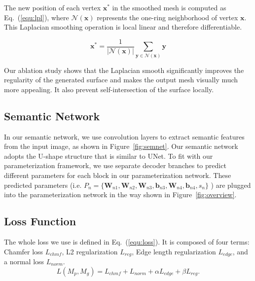 
The new position of each vertex $\mathbf{x}^{*}$ in the smoothed mesh is computed as Eq.~(\ref{equ:lpl}), where $\mathcal{N}(\mathbf{x})$ represents the one-ring neighborhood of vertex $\mathbf{x}$. 
This Laplacian smoothing operation is local linear and therefore differentiable.

\begin{equation}
\mathbf{x}^* = \frac{1}{|\mathcal{N}(\mathbf{x})|}\sum_{\mathbf{y}\in\mathcal{N}(\mathbf{x})}\mathbf{y}
\label{equ:lpl}
\end{equation}

Our ablation study shows that the Laplacian smooth significantly improves the regularity of the generated surface and makes the output mesh visually much more appealing. It also prevent self-intersection of the surface locally.


\subsection{Semantic Network}
\label{subsec:semnet}
%
In our semantic network, we use convolution layers to extract semantic features from the input image, as shown in Figure~\ref{fig:semnet}.  
Our semantic network adopts the U-shape structure that is similar to UNet\cite{unet}. 
To fit with our parameterization framework, we use separate decoder branches to predict different parameters for each block in our parameterization network. These predicted parameters (i.e. $P_n=\{\mathbf{W}_{n1},\mathbf{W}_{n2},\mathbf{W}_{n3},\mathbf{b}_{n3},\mathbf{W}_{n4},\mathbf{b}_{n4},s_{n}\}$ ) are plugged into the parameterization network in the way shown in Figure~\ref{fig:overview}.

\subsection{Loss Function}

The whole loss we use is defined in Eq.~(\ref{equ:loss}).
It is composed of four terms: Chamfer loss $L_{chmf}$, L2 regularization $L_{reg}$, Edge length regularization $L_{edge}$, and a normal loss $L_{norm}$.
\begin{equation}
\label{equ:loss}
L(M_p, M_g ) = L_{chmf} + L_{norm} +\alpha L_{edge}+ \beta L_{reg}.
\end{equation}

